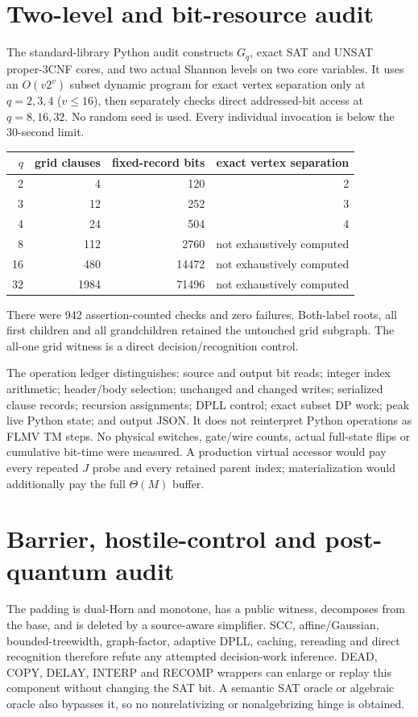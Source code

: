 \documentclass[11pt]{article}
\begin{document}
\section{Two-level and bit-resource audit}
The standard-library Python audit constructs $G_q$, exact SAT and UNSAT
proper-3CNF cores, and two actual Shannon levels on two core variables.  It
uses an $O(v2^v)$ subset dynamic program for exact vertex separation only at
$q=2,3,4$ ($v\le16$), then separately checks direct addressed-bit access at
$q=8,16,32$.  No random seed is used.  Every individual invocation is below
the 30-second limit.

\begin{center}
\begin{tabular}{rrrr}
\toprule
$q$ & grid clauses & fixed-record bits & exact vertex separation\\
\midrule
2&4&120&2\\
3&12&252&3\\
4&24&504&4\\
8&112&2760&not exhaustively computed\\
16&480&14472&not exhaustively computed\\
32&1984&71496&not exhaustively computed\\
\bottomrule
\end{tabular}
\end{center}
There were 942 assertion-counted checks and zero failures.  Both-label roots,
all first children and all grandchildren retained the untouched grid
subgraph.  The all-one grid witness is a direct decision/recognition control.

The operation ledger distinguishes: source and output bit reads; integer
index arithmetic; header/body selection; unchanged and changed writes;
serialized clause records; recursion assignments; DPLL control; exact subset
DP work; peak live Python state; and output JSON.  It does not reinterpret
Python operations as FLMV TM steps.  No physical switches, gate/wire counts,
actual full-state flips or cumulative bit-time were measured.  A production
virtual accessor would pay every repeated $J$ probe and every retained parent
index; materialization would additionally pay the full $\Theta(M)$ buffer.

\section{Barrier, hostile-control and post-quantum audit}
The padding is dual-Horn and monotone, has a public witness, decomposes from
the base, and is deleted by a source-aware simplifier.  SCC, affine/Gaussian,
bounded-treewidth, graph-factor, adaptive DPLL, caching, rereading and direct
recognition therefore refute any attempted decision-work inference.  DEAD,
COPY, DELAY, INTERP and RECOMP wrappers can enlarge or replay this component
without changing the SAT bit.  A semantic SAT oracle or algebraic oracle
also bypasses it, so no nonrelativizing or nonalgebrizing hinge is obtained.
\end{document}
